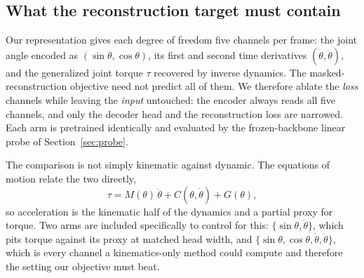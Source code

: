 
\subsection{What the reconstruction target must contain}
\label{sec:ablation-channels}

Our representation gives each degree of freedom five channels per frame: the joint
angle encoded as $(\sin\theta, \cos\theta)$, its first and second time derivatives
$(\dot\theta, \ddot\theta)$, and the generalized joint torque $\tau$ recovered by
inverse dynamics. The masked-reconstruction objective need not predict all of them.
We therefore ablate the \emph{loss} channels while leaving the \emph{input} untouched:
the encoder always reads all five channels, and only the decoder head and the
reconstruction loss are narrowed. Each arm is pretrained identically and evaluated by
the frozen-backbone linear probe of Section~\ref{sec:probe}.

The comparison is not simply kinematic against dynamic. The equations of motion relate
the two directly,
\begin{equation}
\tau = M(\theta)\,\ddot\theta + C(\theta,\dot\theta) + G(\theta),
\label{eq:eom}
\end{equation}
so acceleration is the kinematic half of the dynamics and a partial proxy for torque.
Two arms are included specifically to control for this: $\{\sin\theta,\ddot\theta\}$,
which pits torque against its proxy at matched head width, and
$\{\sin\theta,\cos\theta,\dot\theta,\ddot\theta\}$, which is every channel a
kinematics-only method could compute and therefore the setting our objective must beat.


